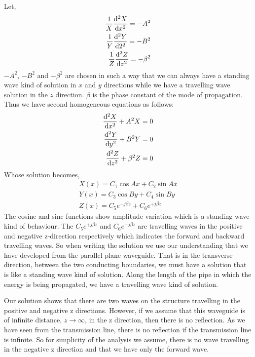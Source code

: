 Let,  
\begin{align*}
\frac{1}{X}\dv[2]{X}{x} = -A^2\\
\frac{1}{Y}\dv[2]{Y}{2} = -B^2\\
\frac{1}{Z}\dv[2]{Z}{z} = -\beta^2
\end{align*}
$-A^2$, $-B^2$ and $-\beta^2$ are chosen in such a way that we can always have a standing wave kind of solution in $x$ and $y$ directions while we have a travelling wave solution in the $z$ direction. $\beta$ is the phase constant of the mode of propagation. Thus we have second homogeneous equations as follows:
\begin{align*}
\dv[2]{X}{x} + A^2X = 0\\
\dv[2]{Y}{y} + B^2Y = 0\\
\dv[2]{Z}{z} + \beta^2Z = 0
\end{align*}
Whose solution becomes,   
\begin{align*}
X(x) = C_{1}\cos Ax + C_{2}\sin Ax\\
Y(x) = C_{3}\cos By + C_{4}\sin By\\
Z(x) = C_{5} e^{-j \beta z} + C_{6} e^{+j \beta z}
\end{align*}                                  
The cosine and sine functions show amplitude variation which is a standing wave kind of behaviour. The $C_{5}e^{+j\beta z}$ and $C_{6}e^{-j\beta z}$ are travelling waves in the positive and negative z-direction respectively which indicates the forward and backward travelling waves. So when writing the solution we use our understanding that we have developed from the parallel plane waveguide. That is in the transverse direction, between the two conducting boundaries, we must have a solution that is like a standing wave kind of solution. Along the length of the pipe in which the energy is being propagated, we have a travelling wave kind of solution.

Our solution shows that there are two waves on the structure travelling in the positive and negative z directions. However, if we assume that this waveguide is of infinite distance, $z \rightarrow\infty$, in the z direction, then there is no reflection. As we have seen from the transmission line, there is no reflection if the transmission line is infinite. So for simplicity of the analysis we assume, there is no wave travelling in the negative z direction and that we have only the forward wave.

